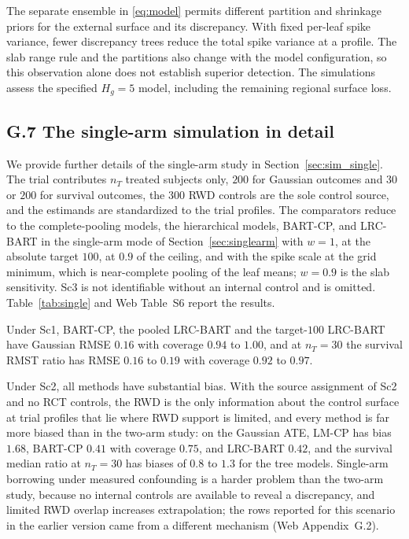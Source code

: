 \documentclass[11pt]{article}
\theoremstyle{definition}
\theoremstyle{plain}
\begin{document}
The separate ensemble in \eqref{eq:model} permits different partition and shrinkage priors for the external surface and its discrepancy. With fixed per-leaf spike variance, fewer discrepancy trees reduce the total spike variance at a profile. The slab range rule and the partitions also change with the model configuration, so this observation alone does not establish superior detection. The simulations assess the specified $H_g=5$ model, including the remaining regional surface loss.

\subsection*{G.7 The single-arm simulation in detail}

We provide further details of the single-arm study in Section~\ref{sec:sim_single}. The trial contributes $n_T$ treated subjects only, $200$ for Gaussian outcomes and $30$ or $200$ for survival outcomes, the $300$ RWD controls are the sole control source, and the estimands are standardized to the trial profiles. The comparators reduce to the complete-pooling models, the hierarchical models, BART-CP, and LRC-BART in the single-arm mode of Section~\ref{sec:singlearm} with $w=1$, at the absolute target $100$, at $0.9$ of the ceiling, and with the spike scale at the grid minimum, which is near-complete pooling of the leaf means; $w=0.9$ is the slab sensitivity. Sc3 is not identifiable without an internal control and is omitted. Table~\ref{tab:single} and Web Table~S6 report the results.

Under Sc1, BART-CP, the pooled LRC-BART and the target-$100$ LRC-BART have Gaussian RMSE $0.16$ with coverage $0.94$ to $1.00$, and at $n_T=30$ the survival RMST ratio has RMSE $0.16$ to $0.19$ with coverage $0.92$ to $0.97$.

Under Sc2, all methods have substantial bias. With the source assignment of Sc2 and no RCT controls, the RWD is the only information about the control surface at trial profiles that lie where RWD support is limited, and every method is far more biased than in the two-arm study: on the Gaussian ATE, LM-CP has bias $1.68$, BART-CP $0.41$ with coverage $0.75$, and LRC-BART $0.42$, and the survival median ratio at $n_T=30$ has biases of $0.8$ to $1.3$ for the tree models. Single-arm borrowing under measured confounding is a harder problem than the two-arm study, because no internal controls are available to reveal a discrepancy, and limited RWD overlap increases extrapolation; the rows reported for this scenario in the earlier version came from a different mechanism (Web Appendix~G.2).
\end{document}

